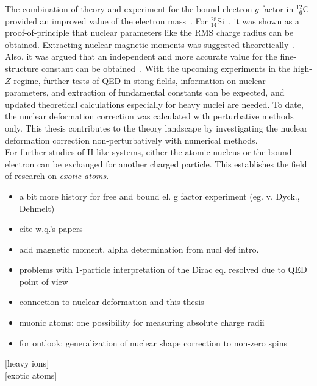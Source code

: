 The combination of theory and experiment for the bound electron $g$ factor in $^{12}_{\phantom{0}6}$C provided an improved value of the electron mass~\cite{Sturm2014,Zatorski2017}. For $^{28}_{14}$Si~\cite{Sturm2011}, it was shown as a proof-of-principle that nuclear parameters like the RMS charge radius can be obtained. Extracting nuclear magnetic moments was suggested theoretically~\cite{Yerokhin2011,Werth2001}. Also, it was argued that an independent and more accurate value for the fine-structure constant can be obtained~\cite{Shabaev2006,yerokhin2016}. With the upcoming experiments in the high-$Z$ regime, further tests of QED in stong fields, information on nuclear parameters, and extraction of fundamental constants can be expected, and updated theoretical calculations especially for heavy nuclei are needed. To date, the nuclear deformation correction was calculated with perturbative methods only. This thesis contributes to the theory landscape by investigating the nuclear deformation correction non-perturbatively with numerical methods.\\[11pt]
For further studies of H-like systems, either the atomic nucleus or the bound electron can be exchanged for another charged particle. This establishes the field of research on \textit{exotic atoms}.







































\clearpage

\begin{itemize}
\item a bit more history for free and bound el. g factor experiment (eg. v. Dyck., Dehmelt)
\item cite w.q.'s papers
\item add magnetic moment, alpha determination from nucl def intro.
\item problems with 1-particle interpretation of the Dirac eq. resolved due to QED point of view
\item connection to nuclear deformation and this thesis
\item muonic atoms: one possibility for measuring absolute charge radii
\item for outlook: generalization of nuclear shape correction to non-zero spins
\end{itemize}
[heavy ions]\\[11pt]
[exotic atoms]\\[11pt]

